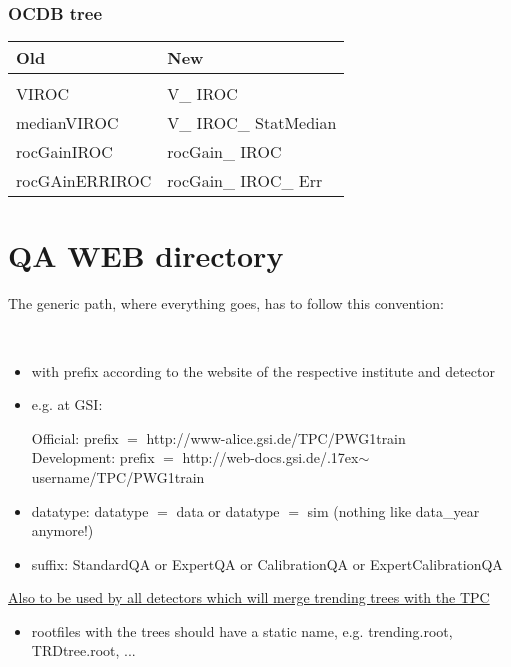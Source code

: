 \documentclass[11pt,a4paper]{article}
\begin{document}
\subsubsection{OCDB tree}
\begin{tabular}{ l l}
Old & New \\ 
\hline 
 &  \\ 
VIROC &  V\_ IROC\\ 
medianVIROC & V\_ IROC\_ StatMedian \\ 
rocGainIROC & rocGain\_ IROC \\ 
rocGAinERRIROC &  rocGain\_ IROC\_ Err\\ 
\end{tabular} 

%
%     
%
%
%     

\section{QA WEB directory}

The generic path, where everything goes, has to follow this convention: \\
\parindent0pt

 \\

\begin{itemize}

\item with prefix according to the website of the respective institute and detector 
\item e.g. at GSI:

\subitem Official:           prefix $=$ http://www-alice.gsi.de/TPC/PWG1train \\
\subitem Development: prefix $=$ http://web-docs.gsi.de/{\raise.17ex\hbox{$\scriptstyle\mathtt{\sim}$}}username/TPC/PWG1train \\

\item datatype: datatype $=$ data   or   datatype $=$ sim   (nothing like data\_year anymore!) \\
\item suffix:  StandardQA  or  ExpertQA  or  CalibrationQA  or  ExpertCalibrationQA \\

\end{itemize}

\underline{Also to be used by all detectors which will merge trending trees with the TPC}
\begin{itemize}
\item rootfiles with the trees should have a static name, e.g. trending.root, TRDtree.root, ...

\end{itemize}
\end{document}
